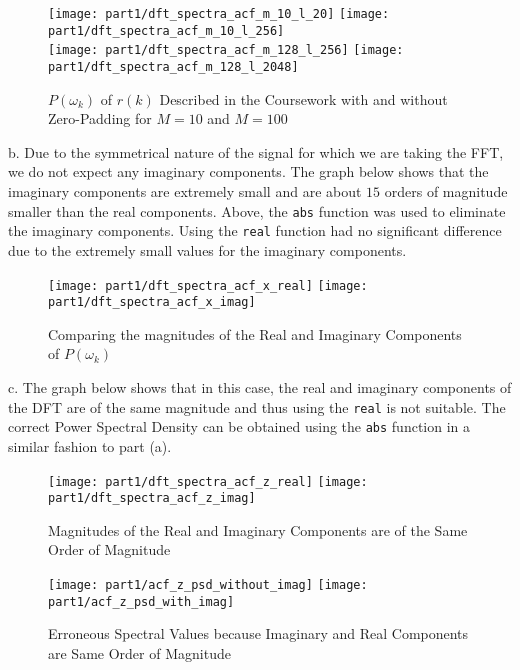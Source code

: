 \begin{figure}[H]
\centering{}
\texttt{[image: part1/dft\_spectra\_acf\_m\_10\_l\_20]}
\texttt{[image: part1/dft\_spectra\_acf\_m\_10\_l\_256]} \\
\texttt{[image: part1/dft\_spectra\_acf\_m\_128\_l\_256]}
\texttt{[image: part1/dft\_spectra\_acf\_m\_128\_l\_2048]}
\caption{$P(\omega_{k})$ of $r(k)$ Described in the Coursework with and without Zero-Padding for $M=10$ and $M=100$}
\end{figure}

\noindent{}b. Due to the symmetrical nature of the signal for which we are taking the FFT, we do not expect any imaginary components. The graph below shows that the imaginary components are extremely small and are about $15$ orders of magnitude smaller than the real components. Above, the \texttt{abs} function was used to eliminate the imaginary components. Using the \texttt{real} function had no significant difference due to the extremely small values for the imaginary components.

\begin{figure}[H]
\centering{}
\texttt{[image: part1/dft\_spectra\_acf\_x\_real]}
\texttt{[image: part1/dft\_spectra\_acf\_x\_imag]}
\caption{Comparing the magnitudes of the Real and Imaginary Components of $P(\omega_k)$}
\end{figure}


\noindent{}c. The graph below shows that in this case, the real and imaginary components of the DFT are of the same magnitude and thus using the \texttt{real} is not suitable. The correct Power Spectral Density can be obtained using the \texttt{abs} function in a similar fashion to part (a).

\begin{figure}[H]
\centering{}
\texttt{[image: part1/dft\_spectra\_acf\_z\_real]}
\texttt{[image: part1/dft\_spectra\_acf\_z\_imag]}
\caption{Magnitudes of the Real and Imaginary Components are of the Same Order of Magnitude} 
\end{figure}

\begin{figure}[H]
\centering{}
\texttt{[image: part1/acf\_z\_psd\_without\_imag]}
\texttt{[image: part1/acf\_z\_psd\_with\_imag]}
\caption{Erroneous Spectral Values because Imaginary and Real Components are Same Order of Magnitude}
\end{figure}


